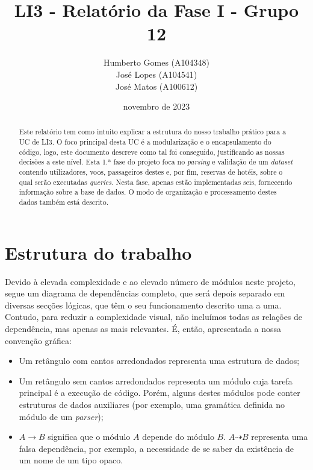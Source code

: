 \documentclass[12pt, a4paper]{article}
\title{\textbf{LI3 - Relatório da Fase I - Grupo 12}}
\author{
    Humberto Gomes (A104348) \\
    José Lopes     (A104541) \\
    José Matos     (A100612) \\
}
\date{novembro de 2023}
\begin{document}
\maketitle
\onehalfspacing
\setlength{\parskip}{\baselineskip}
\setlength{\parindent}{0pt}

\begin{abstract}
    Este relatório tem como intuito explicar a estrutura do nosso trabalho prático para a UC de LI3.
    O foco principal desta UC é a modularização e o encapsulamento do código, logo, este documento
    descreve como tal foi conseguido, justificando as nossas decisões a este nível. Esta 1.ª fase do
    projeto foca no \emph{parsing} e validação de um \emph{dataset} contendo utilizadores, voos,
    passageiros destes e, por fim, reservas de hotéis, sobre o qual serão executadas \emph{queries}.
    Nesta fase, apenas estão implementadas seis, fornecendo informação sobre a base de dados. O
    modo de organização e processamento destes dados também está descrito.
\end{abstract}

\section{Estrutura do trabalho}

Devido à elevada complexidade e ao elevado número de módulos neste projeto, segue um diagrama
de dependências completo, que será depois separado em diversas secções lógicas, que têm o seu
funcionamento descrito uma a uma. Contudo, para reduzir a complexidade visual, não incluímos
todas as relações de dependência, mas apenas as mais relevantes. É, então, apresentada a
nossa convenção gráfica:

\begin{itemize}
    \item Um retângulo com cantos arredondados representa uma estrutura de dados;
    \item Um retângulo sem cantos arredondados representa um módulo cuja tarefa principal é a
          execução de código. Porém, alguns destes módulos pode conter estruturas de dados
          auxiliares (por exemplo, uma gramática definida no módulo de um \emph{parser});
    \item $A \rightarrow B$ significa que o módulo $A$ depende do módulo $B$. $A \dashrightarrow B$
          representa uma falsa dependência, por exemplo, a necessidade de se saber da existência
          de um nome de um tipo opaco.
\end{itemize}
\end{document}
